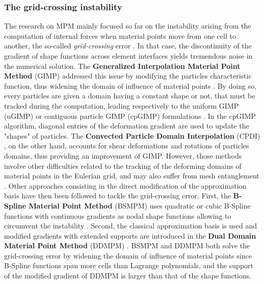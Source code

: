 \subsubsection*{The grid-crossing instability}
The research on MPM mainly focused so far on the instability arising from the computation of internal forces when material points move from one cell to another, the so-called \textit{grid-crossing} error \cite{Gimp}. In that case, the discontinuity of the gradient of shape functions across element interfaces yields tremendous noise in the numerical solution. The \textbf{Generalized Interpolation Material Point Method} (GIMP) addressed this issue by modifying the particles characteristic function, thus widening the domain of influence of material points \cite{Gimp}. By doing so, every particles are given a domain having a constant shape or not, that must be tracked during the computation, leading respectively to the uniform GIMP (uGIMP) or contiguous particle GIMP (cpGIMP) formulations \cite{Book_MPM}. In the cpGIMP algorithm, diagonal entries of the deformation gradient are used to update the "shapes" of particles. The \textbf{Convected Particle Domain Interpolation} (CPDI) \cite{CPDI}, on the other hand, accounts for shear deformations and rotations of particles domains, thus providing an improvement of GIMP. However, those methods involve other difficulties related to the tracking of the deforming domains of material points in the Eulerian grid, and may also suffer from mesh entanglement \cite{DDMPM0}. Other approaches consisting in the direct modification of the approximation basis have then been followed to tackle the grid-crossing error. First, the \textbf{B-Spline Material Point Method} (BSMPM) \cite{Steffen_quadError} uses quadratic or cubic B-Spline functions with continuous gradients as nodal shape functions allowing to circumvent the instability \cite{MPM_BSpline1}. %
Second, the classical approximation basis is used and modified gradients with extended supports are introduced in the \textbf{Dual Domain Material Point Method} (DDMPM) \cite{DDMPM0}. BSMPM and DDMPM  both solve the grid-crossing error by widening the domain of influence of material points since B-Spline functions span more cells than Lagrange polynomials, and the support of the modified gradient of DDMPM is larger than that of the shape functions.  

